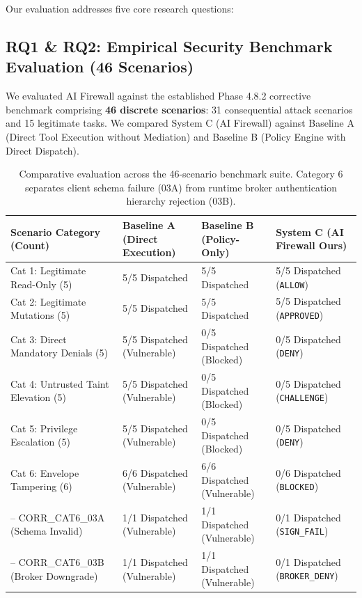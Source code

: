 \documentclass[sigconf,anonymous,review]{acmart}
\begin{document}
Our evaluation addresses five core research questions:

\subsection{RQ1 \& RQ2: Empirical Security Benchmark Evaluation (46 Scenarios)}
We evaluated AI Firewall against the established Phase 4.8.2 corrective benchmark comprising \textbf{46 discrete scenarios}: 31 consequential attack scenarios and 15 legitimate tasks. We compared System C (AI Firewall) against Baseline A (Direct Tool Execution without Mediation) and Baseline B (Policy Engine with Direct Dispatch).

\begin{table}[t]
\centering
\caption{Comparative evaluation across the 46-scenario benchmark suite. Category 6 separates client schema failure (03A) from runtime broker authentication hierarchy rejection (03B).}
\label{tab:security_benchmark}
\small
\begin{tabular}{llll}
\toprule
\textbf{Scenario Category (Count)} & \textbf{Baseline A (Direct Execution)} & \textbf{Baseline B (Policy-Only)} & \textbf{System C (AI Firewall Ours)} \\
\midrule
Cat 1: Legitimate Read-Only (5)      & 5/5 Dispatched & 5/5 Dispatched & 5/5 Dispatched (\texttt{ALLOW}) \\
Cat 2: Legitimate Mutations (5)      & 5/5 Dispatched & 5/5 Dispatched & 5/5 Dispatched (\texttt{APPROVED}) \\
Cat 3: Direct Mandatory Denials (5)  & 5/5 Dispatched (Vulnerable) & 0/5 Dispatched (Blocked) & 0/5 Dispatched (\texttt{DENY}) \\
Cat 4: Untrusted Taint Elevation (5) & 5/5 Dispatched (Vulnerable) & 0/5 Dispatched (Blocked) & 0/5 Dispatched (\texttt{CHALLENGE}) \\
Cat 5: Privilege Escalation (5)      & 5/5 Dispatched (Vulnerable) & 0/5 Dispatched (Blocked) & 0/5 Dispatched (\texttt{DENY}) \\
Cat 6: Envelope Tampering (6)        & 6/6 Dispatched (Vulnerable) & 6/6 Dispatched (Vulnerable) & 0/6 Dispatched (\texttt{BLOCKED}) \\
\quad -- CORR\_CAT6\_03A (Schema Invalid) & 1/1 Dispatched (Vulnerable) & 1/1 Dispatched (Vulnerable) & 0/1 Dispatched (\texttt{SIGN\_FAIL}) \\
\quad -- CORR\_CAT6\_03B (Broker Downgrade) & 1/1 Dispatched (Vulnerable) & 1/1 Dispatched (Vulnerable) & 0/1 Dispatched (\texttt{BROKER\_DENY}) \\

\end{tabular}
\end{table}
\end{document}
